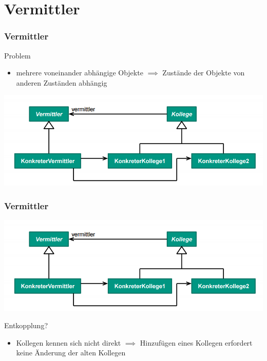 \documentclass[18pt]{beamer}
\begin{document}
\section{Vermittler}
	\begin{frame}
	\frametitle{Vermittler}
	
	\begin{block}{Problem}
		\begin{itemize}
			\item mehrere voneinander abhängige Objekte \linebreak \pause $\implies$ Zustände der Objekte von anderen Zuständen abhängig
		\end{itemize}
	\end{block}
	\pause
	\centering
	\includegraphics[scale=0.45]{./pics/tut3/med.png}
\end{frame}

\begin{frame}
	\frametitle{Vermittler}
	\centering
	\includegraphics[scale=0.45]{./pics/tut3/med.png}
	\begin{block}{Entkopplung?}
	\begin{itemize}
		\pause 
		\item Kollegen kennen sich nicht direkt  \linebreak \pause $\implies$ Hinzufügen eines Kollegen erfordert keine Änderung der alten Kollegen
	\end{itemize}
	\end{block}
\end{frame}
\end{document}

